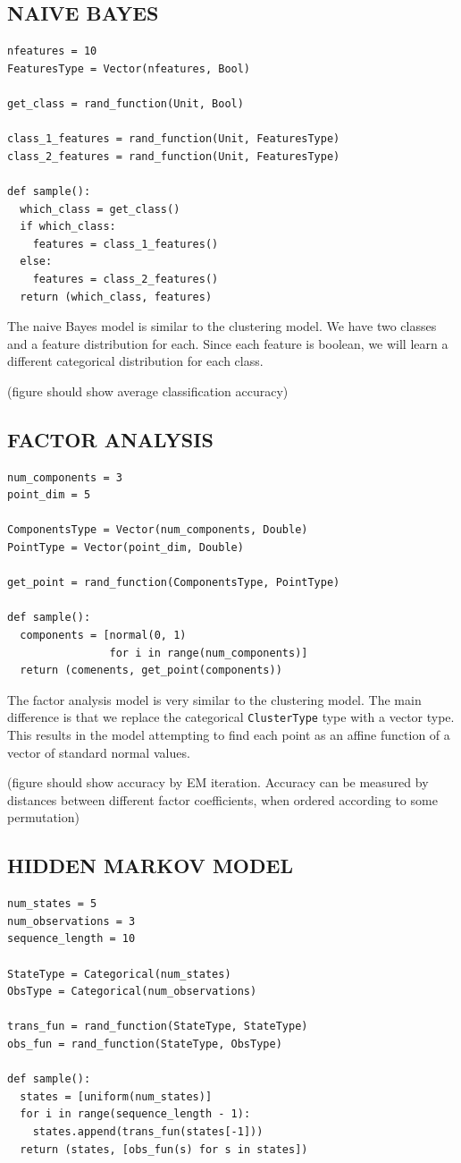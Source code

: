 \documentclass{article}
\begin{document}
\subsection{NAIVE BAYES}

{\small
\begin{verbatim}
nfeatures = 10
FeaturesType = Vector(nfeatures, Bool)

get_class = rand_function(Unit, Bool)

class_1_features = rand_function(Unit, FeaturesType)
class_2_features = rand_function(Unit, FeaturesType)

def sample():
  which_class = get_class()
  if which_class:
    features = class_1_features()
  else:
    features = class_2_features()
  return (which_class, features)
\end{verbatim}
}

The naive Bayes model is similar to the clustering model.  We have two classes and a feature
distribution for each.  Since each feature is boolean, we will learn
a different categorical distribution for each class.

(figure should show average classification accuracy)

  \subsection{FACTOR ANALYSIS}
{\small
\begin{verbatim}
num_components = 3
point_dim = 5

ComponentsType = Vector(num_components, Double)
PointType = Vector(point_dim, Double)

get_point = rand_function(ComponentsType, PointType)

def sample():
  components = [normal(0, 1)
                for i in range(num_components)]
  return (comenents, get_point(components))
\end{verbatim}
}

The factor analysis model is very similar to the clustering model.  The main difference is that we replace the categorical \texttt{ClusterType} type with a vector type.  This results in the model attempting to find each point as an affine function of a vector of standard normal values.

(figure should show accuracy by EM iteration.  Accuracy can be measured by distances between different factor coefficients, when ordered according to some permutation)
  \subsection{HIDDEN MARKOV MODEL}
{\small
\begin{verbatim}
num_states = 5
num_observations = 3
sequence_length = 10

StateType = Categorical(num_states)
ObsType = Categorical(num_observations)

trans_fun = rand_function(StateType, StateType)
obs_fun = rand_function(StateType, ObsType)

def sample():
  states = [uniform(num_states)]
  for i in range(sequence_length - 1):
    states.append(trans_fun(states[-1]))
  return (states, [obs_fun(s) for s in states])
\end{verbatim}
}
\end{document}
